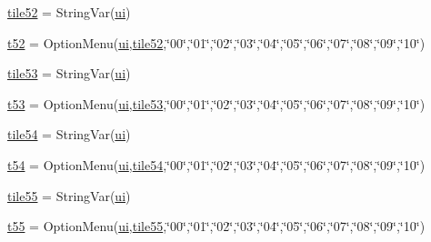 \begin{DoxyCompactItemize}
\item 
\mbox{\hyperlink{namespacegui_a0a21b48dd64e7d0944745635aa9d8c8b}{tile52}} = String\+Var(\mbox{\hyperlink{namespacegui_a40ab7281456eadbea2dc2038f5c24fa1}{ui}})
\item 
\mbox{\hyperlink{namespacegui_aa53ad7d5dedd61f40709867b5b271755}{t52}} = Option\+Menu(\mbox{\hyperlink{namespacegui_a40ab7281456eadbea2dc2038f5c24fa1}{ui}},\mbox{\hyperlink{namespacegui_a0a21b48dd64e7d0944745635aa9d8c8b}{tile52}},\char`\"{}00\char`\"{},\char`\"{}01\char`\"{},\char`\"{}02\char`\"{},\char`\"{}03\char`\"{},\char`\"{}04\char`\"{},\char`\"{}05\char`\"{},\char`\"{}06\char`\"{},\char`\"{}07\char`\"{},\char`\"{}08\char`\"{},\char`\"{}09\char`\"{},\char`\"{}10\char`\"{})
\item 
\mbox{\hyperlink{namespacegui_a449b826a702e5cc4b285882012dd3d8a}{tile53}} = String\+Var(\mbox{\hyperlink{namespacegui_a40ab7281456eadbea2dc2038f5c24fa1}{ui}})
\item 
\mbox{\hyperlink{namespacegui_ae4081ef0f03c5305cf8c4d3ef3f07fcc}{t53}} = Option\+Menu(\mbox{\hyperlink{namespacegui_a40ab7281456eadbea2dc2038f5c24fa1}{ui}},\mbox{\hyperlink{namespacegui_a449b826a702e5cc4b285882012dd3d8a}{tile53}},\char`\"{}00\char`\"{},\char`\"{}01\char`\"{},\char`\"{}02\char`\"{},\char`\"{}03\char`\"{},\char`\"{}04\char`\"{},\char`\"{}05\char`\"{},\char`\"{}06\char`\"{},\char`\"{}07\char`\"{},\char`\"{}08\char`\"{},\char`\"{}09\char`\"{},\char`\"{}10\char`\"{})
\item 
\mbox{\hyperlink{namespacegui_ac53f25e251f182149848acb4f70689ce}{tile54}} = String\+Var(\mbox{\hyperlink{namespacegui_a40ab7281456eadbea2dc2038f5c24fa1}{ui}})
\item 
\mbox{\hyperlink{namespacegui_ab0d0b4de13ca619fb73889f8d1456ab9}{t54}} = Option\+Menu(\mbox{\hyperlink{namespacegui_a40ab7281456eadbea2dc2038f5c24fa1}{ui}},\mbox{\hyperlink{namespacegui_ac53f25e251f182149848acb4f70689ce}{tile54}},\char`\"{}00\char`\"{},\char`\"{}01\char`\"{},\char`\"{}02\char`\"{},\char`\"{}03\char`\"{},\char`\"{}04\char`\"{},\char`\"{}05\char`\"{},\char`\"{}06\char`\"{},\char`\"{}07\char`\"{},\char`\"{}08\char`\"{},\char`\"{}09\char`\"{},\char`\"{}10\char`\"{})
\item 
\mbox{\hyperlink{namespacegui_ab5439a2d27d228c10b945525d2cd4ba1}{tile55}} = String\+Var(\mbox{\hyperlink{namespacegui_a40ab7281456eadbea2dc2038f5c24fa1}{ui}})
\item 
\mbox{\hyperlink{namespacegui_ac06a8c29ba1eb2c7a445dd7df65ea3b9}{t55}} = Option\+Menu(\mbox{\hyperlink{namespacegui_a40ab7281456eadbea2dc2038f5c24fa1}{ui}},\mbox{\hyperlink{namespacegui_ab5439a2d27d228c10b945525d2cd4ba1}{tile55}},\char`\"{}00\char`\"{},\char`\"{}01\char`\"{},\char`\"{}02\char`\"{},\char`\"{}03\char`\"{},\char`\"{}04\char`\"{},\char`\"{}05\char`\"{},\char`\"{}06\char`\"{},\char`\"{}07\char`\"{},\char`\"{}08\char`\"{},\char`\"{}09\char`\"{},\char`\"{}10\char`\"{})

\end{DoxyCompactItemize}
